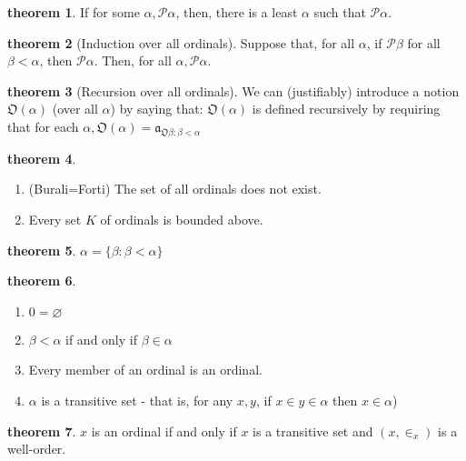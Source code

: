 \documentclass[a4paper,11pt]{article}%
\theoremstyle{remark}
\theoremstyle{definition}
\newtheorem{theorem}{theorem}[section]
\theoremstyle{definition}
\theoremstyle{plain}
\theoremstyle{definition}
\begin{document}
\begin{theorem}
    If for some $\alpha,\mathcal{P}\alpha$, then, there is a least $\alpha$ such that $\mathcal{P}\alpha$. 
\end{theorem}
\begin{theorem}[Induction over all ordinals]
   Suppose that, for all $\alpha$, if $\mathcal{P}\beta$ for all $\beta<\alpha$,
   then $\mathcal{P}\alpha$. Then, for all $\alpha,\mathcal{P}\alpha$. 
\end{theorem}
\begin{theorem}[Recursion over all ordinals]
   We can (justifiably) introduce a notion $\mathfrak{O}(\alpha)$ (over all $\alpha$)
   by saying that: $\mathfrak{O}(\alpha)$ is defined recursively by requiring that for each $\alpha,\mathfrak{O}(\alpha)=\mathfrak{a}_{\mathfrak{O}\beta:\beta<\alpha}$ 
\end{theorem}
\begin{theorem}
    \begin{enumerate}
        \item (Burali=Forti) The set of all ordinals does not exist.
        \item Every set $K$ of ordinals is bounded above.
    \end{enumerate}
\end{theorem}
\begin{theorem}
    $\alpha=\{\beta:\beta<\alpha\}$
\end{theorem}
\begin{theorem}
    \begin{enumerate}
        \item $0=\varnothing$
        \item $\beta<\alpha$ if and only if $\beta\in\alpha$
        \item Every member of an ordinal is an ordinal.
        \item $\alpha$ is a transitive set - that is, for any $x,y$, if $x\in y\in \alpha$ then $x\in \alpha$)
    \end{enumerate}
\end{theorem}
\begin{theorem}
    $x$ is an ordinal if and only if $x$ is a transitive set and $(x,\in_x)$ is a well-order.
\end{theorem}
\end{document}
